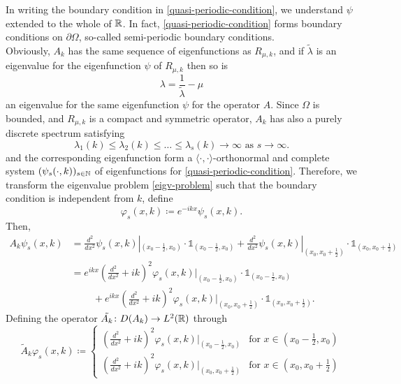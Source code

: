 In writing the boundary condition in \eqref{quasi-periodic-condition}, we understand $\psi$ extended to the whole of $\mathbb{R}$. In fact, \eqref{quasi-periodic-condition} forms boundary conditions on $\partial \Omega$, so-called semi-periodic boundary conditions.
~\\
Obviously, $A_{k}$ has the same sequence of eigenfunctions as $R_{\mu, k}$, and if $\tilde{\lambda}$ is an eigenvalue for the eigenfunction $\psi$ of $R_{\mu, k}$ then so is
	\[ \lambda = \frac{1}{\tilde{\lambda}} - \mu \]
 an eigenvalue for the same eigenfunction $\psi$ for the operator $A$. Since $\Omega$ is bounded, and $R_{\mu, k}$ is a compact and symmetric operator, $A_{k}$ has also a purely discrete spectrum satisfying	
	\[ \lambda_{1}(k) \leq \lambda_{2}(k) \leq \dotsc \leq \lambda_{s}(k) \rightarrow \infty \text{ as } s \rightarrow \infty. \]
and the corresponding eigenfunction form a $\langle \cdot , \cdot \rangle$-orthonormal and complete system $(\psi_{s}(\cdot, k))_{s \in \mathbb{N}}$ of eigenfunctions for \eqref{quasi-periodic-condition}. Therefore, we transform the eigenvalue problem \eqref{eigv-problem} such that the boundary condition is independent from $k$, define %
	\[ \varphi_{s}(x, k) \coloneqq e^{-ikx} \psi_{s}(x, k). \]
Then, %
	\begin{align*}
		A_{k} \psi_{s}(x, k) & = \frac{d^{2}}{dx^{2}} \psi_{s}(x, k)|_{(x_{0} - \frac{1}{2}, x_{0})} \cdot \mathds{1}_{(x_{0} - \frac{1}{2}, x_{0})} + \frac{d^{2}}{dx^{2}} \psi_{s}(x, k)|_{(x_{0}, x_{0}  + \frac{1}{2})} \cdot \mathds{1}_{(x_{0}, x_{0} + \frac{1}{2})} \\
				& = e^{ikx} \left( \frac{d^{2}}{dx^{2}} + ik \right)^{2} \varphi_{s}(x, k)|_{(x_{0} - \frac{1}{2}, x_{0})} \cdot \mathds{1}_{(x_{0} - \frac{1}{2}, x_{0})} \\
				& ~\qquad + e^{ikx} \left( \frac{d^{2}}{dx^{2}} + ik \right)^{2} \varphi_{s}(x, k)|_{(x_{0}, x_{0}  + \frac{1}{2})} \cdot \mathds{1}_{(x_{0}, x_{0} + \frac{1}{2})}.
	\end{align*}
Defining the operator $\tilde{A_{k}} \colon D(A_{k}) \rightarrow L^{2}(\mathbb{R})$ through 
	\[ \tilde{A}_{k} \varphi_{s}(x, k) \coloneqq \begin{cases}
 		\left( \frac{d^{2}}{dx^{2}} + ik \right)^{2} \varphi_{s}(x, k)|_{(x_{0} - \frac{1}{2}, x_{0})} & \text{for } x \in (x_{0} - \frac{1}{2}, x_{0}) \\ \left( \frac{d^{2}}{dx^{2}} + ik \right)^{2} \varphi_{s}(x, k)|_{(x_{0}, x_{0}  + \frac{1}{2})} & \text{for } x \in (x_{0}, x_{0} + \frac{1}{2})
 	\end{cases} \] 
